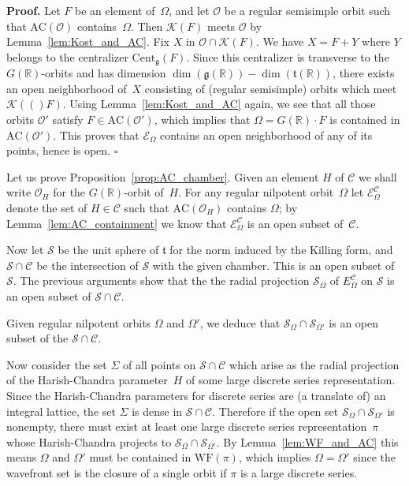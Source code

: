 \documentclass[10pt,leqno]{article}
\newcommand{\qed}{\hfill $\square$ \medskip}
\newenvironment{proof}[1][Proof]{\noindent\textbf{#1.} }{\qed}
\newcommand{\R}{\mathbb R}
\renewcommand{\t}{\mathfrak t}
\newcommand{\g}{\mathfrak g}
\newcommand{\WF}{\mathrm{WF}}
\newcommand{\AC}{\mathrm{AC}}
\newcommand{\Kostant}[1]{\mathcal{K}(#1)}
\newcommand{\ECom}{\mathcal{E}^{\mathcal{C}}_\Omega}
\begin{document}
\begin{proof}
Let $F$ be an element of~$\Omega$, and let $\mathcal{O}$  be a regular semisimple orbit such that $\AC(\mathcal{O})$ contains~$\Omega$.
Then $\Kostant{F}$ meets $\mathcal{O}$ by  Lemma~\ref{lem:Kost_and_AC}. 
Fix $X$ in $\mathcal{O} \cap \Kostant{F}$.
We have $X =F+Y$ where $Y$ belongs to the centralizer $\mathrm{Cent}_\g(F)$.
Since this centralizer is transverse to the $G(\R)$-orbits and has dimension $\dim(\g(\R))-\dim(\t(\R))$,
there exists an open neighborhood of~$X$ consisting of (regular semisimple) orbits  which meet $\Kostant(F)$.
Using Lemma~\ref{lem:Kost_and_AC} again, we see that all those orbits $\mathcal{O}'$ satisfy $F \in \AC(\mathcal{O}')$,
which implies that $\Omega = G(\R) \cdot F$ is contained in $\AC(\mathcal{O}')$.
This proves that $\mathcal{E}_\Omega$ contains an open neighborhood of any of its points, hence is open.   \end{proof}


Let us prove Proposition~\ref{prop:AC_chamber}. Given an element $H$ of $\mathcal{C}$ we shall write $\mathcal{O}_H$ for the $G(\R)$-orbit of~$H$. For any regular nilpotent orbit~$\Omega$ let $\ECom$  denote the set of $H \in \mathcal{C}$ such that $\AC(\mathcal{O}_H)$ contains $\Omega$; by Lemma~\ref{lem:AC_containment}  we know that   $\ECom$ is an open subset of~$\mathcal{C}$. 

Now let $\mathcal{S}$ be the unit sphere of $\t$ for the norm induced by the Killing form, and $\mathcal{S} \cap \mathcal{C}$ be the intersection of $\mathcal{S}$ with the given chamber. This is an open subset of $\mathcal{S}$. The previous arguments show that the the radial projection $\mathcal{S}_{\Omega}$ of  $E^{\mathcal{C}}_\Omega$ on $\mathcal{S}$ is an open subset of $\mathcal{S} \cap \mathcal{C}$. 

Given regular nilpotent orbits $\Omega$ and $\Omega'$, we deduce that $\mathcal{S}_\Omega \cap \mathcal{S}_{\Omega'}$ is an open subset of the $\mathcal{S} \cap \mathcal{C}$.

Now consider the set $\Sigma$ of all points on $\mathcal{S} \cap \mathcal{C}$ which arise as the radial projection of the Harish-Chandra parameter~$H$ of some large discrete series representation. Since the Harish-Chandra parameters for discrete series are (a translate of) an integral lattice, the set $\Sigma$ is dense in $\mathcal{S} \cap \mathcal{C}$. Therefore if the open set $\mathcal{S}_\Omega \cap \mathcal{S}_{\Omega'}$ is nonempty, there must exist at least one large discrete series representation~$\pi$ whose Harish-Chandra projects to $\mathcal{S}_\Omega \cap \mathcal{S}_{\Omega'}$. By Lemma~\ref{lem:WF_and_AC} this means $\Omega$ and $\Omega'$ must be contained in $\WF(\pi)$, which implies $\Omega = \Omega'$ since the wavefront set is the closure of a single orbit if $\pi$ is a large discrete series. 
\end{document}
